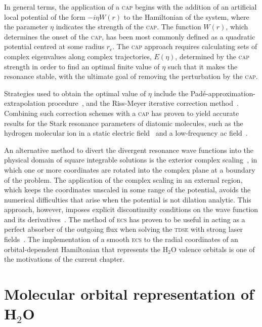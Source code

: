In general terms, the application of a \textsc{cap} begins with the
addition of an artificial local potential of the form $-i \eta W(r)$
to the Hamiltonian of the system, where the parameter $\eta$ indicates
the strength of the \textsc{cap}. The function $W(r)$, which
determines the onset of the \textsc{cap}, has been most commonly
defined as a quadratic potential centred at some radius
$r_{\mathrm{c}}$. The \textsc{cap} approach requires calculating sets
of complex eigenvalues along complex trajectories, $E(\eta)$,
determined by the \textsc{cap} strength in order to find an optimal
finite value of $\eta$ such that it makes the resonance stable, with
the ultimate goal of removing the perturbation by the \textsc{cap}.

Strategies used to obtain the optimal value of $\eta$ include the
Pad\'{e}-approximation-extrapolation
procedure~\cite{Moiseyev_Pade_2005}, and the Riss-Meyer iterative
correction method~\cite{RissMeyer_1993}. Combining such correction
schemes with a \textsc{cap} has proven to yield accurate results for
the Stark resonance parameters of diatomic molecules, such as the
hydrogen molecular ion in a static electric field~\cite{Tsog_2013} and
a low-frequency ac field~\cite{Tsog_H2mol_ac_2013}.

An alternative method to divert the divergent resonance wave functions
into the physical domain of square integrable solutions is the
exterior complex scaling~\cite{Simon_1979}, in which one or more
coordinates are rotated into the complex plane at a boundary of the
problem. The application of the complex scaling in an external region,
which keeps the coordinates unscaled in some range of the potential,
avoids the numerical difficulties that arise when the potential is not
dilation analytic. This approach, however, imposes explicit
discontinuity conditions on the wave function and its
derivatives~\cite{ScrinziJChemPhys_ECS}. The method of \textsc{ecs}
has proven to be useful in acting as a perfect absorber of the
outgoing flux when solving the \textsc{tdse} with strong laser
fields~\cite{ecsScrinzi}. The implementation of a smooth \textsc{ecs}
to the radial coordinates of an orbital-dependent Hamiltonian that
represents the H$_{2}$O valence orbitals is one of the motivations of
the current chapter.


\section{Molecular orbital representation of H$_{2}$O}
\label{ch:h2o_structure}

